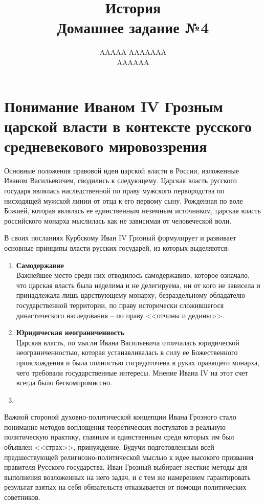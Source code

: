 \documentclass[12pt]{article}
\title{История \\ Домашнее задание №4}
\author{AAAAA AAAAAAA \\ AAAAAA}
\newcommand{\red}[1]{{\color{red}{#1}}}
\begin{document}
  \maketitle
  \setcounter{section}{1}

  \section{Понимание Иваном IV Грозным царской власти в контексте русского средневекового мировоззрения}

  Основные положения правовой идеи царской власти в России, изложенные Иваном Васильевичем, сводились к следующему.
  Царская власть русского государя являлась наследственной по праву мужского первородства по нисходящей мужской линии от отца к его первому сыну.
  Рожденная по воле Божией, которая являлась ее единственным неземным источником,
  царская власть российского монарха мыслилась как не зависимая от человеческой воли.

  В своих посланиях Курбскому Иван IV Грозный формулирует и развивает основные принципы власти русских государей, из которых выделяются:

  \begin{enumerate}[label=\textbf{\large\arabic*}]
    \item {\bf\large Самодержавие} \\
    Важнейшее место среди них отводилось самодержавию, которое означало,
    что царская власть была неделима и не делегируема, ни от кого не зависела и принадлежала лишь царствующему монарху,
    безраздельному обладателю государственной территории,
    по праву исторически сложившегося династического наследования -- по праву <<отчины и дедины>>.

    \item {\bf\large Юридическая неограниченность} \\
    Царская власть, по мысли Ивана Васильевича отличалась юридической неограниченностью,
    которая устанавливалась в силу ее Божественного происхождения и была полностью сосредоточена в руках правящего монарха,
    чего требовали государственные интересы.
    Мнение Ивана IV на этот счет всегда было бескомпромиссно.

    \item \red{\bf\large Чтото ещё} \\
  \end{enumerate}

  Важной стороной духовно-политической концепции Ивана Грозного стало понимание методов воплощения теоретических постулатов
  в реальную политическую практику, главным и единственным среди которых им был объявлен <<страх>>, принуждение.
  Будучи подготовленным всей предшествующей религиозно-политической мыслью к идее высокого призвания правителя Русского государства,
  Иван Грозный выбирает жесткие методы для выполнения возложенных на него задач,
  и с тем же намерением гарантировать результат взятых на себя обязательств отказывается от помощи политических советников.
\end{document}
